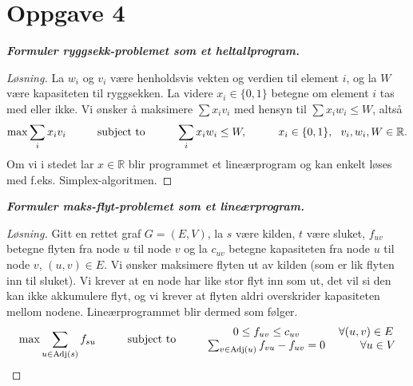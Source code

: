\documentclass[12pt]{article}
\newenvironment{solution}{\begin{proof}[Løsning]}{\end{proof}}
\begin{document}
\section{Oppgave 4}
\it{\textbf{Formuler ryggsekk-problemet som et heltallprogram.}}
\begin{solution}
La $w_i$ og $v_i$ være henholdsvis vekten og verdien til element $i$, og la $W$ være kapasiteten til ryggsekken. La videre $x_i \in \{0, 1\}$ betegne om element $i$ tas med eller ikke. Vi ønsker å maksimere $\sum x_i v_i$ med hensyn til $\sum x_i w_i \leq W$, altså
\begin{equation*}
\max \sum_{i} x_i v_i \hspace{1cm} \textrm{subject to} \hspace{1 cm} \sum_i x_i w_i \leq W, \hspace{1cm} x_i \in \{0, 1\},~~ v_i, w_i, W \in \mathbb{R}.
\end{equation*}
Om vi i stedet lar $x \in \mathbb{R}$ blir programmet et lineærprogram og kan enkelt løses med f.eks. Simplex-algoritmen.
\end{solution}

\it{\textbf{Formuler maks-flyt-problemet som et lineærprogram.}}

\begin{solution}
Gitt en rettet graf $G = (E, V)$, la $s$ være kilden, $t$ være sluket, $f_{uv}$ betegne flyten fra node $u$ til node $v$ og  la  $c_{uv}$ betegne kapasiteten fra node $u$ til node $v$, $(u, v) \in E$. Vi ønsker maksimere flyten ut av kilden (som er lik flyten inn til sluket). Vi krever at en node har like stor flyt inn som ut, det vil si den kan ikke akkumulere flyt, og vi krever at flyten aldri overskrider kapasiteten mellom nodene. Lineærprogrammet blir dermed som følger.
\begin{equation*}
\max \sum_{u \in \textrm{Adj}(s)} f_{su} \hspace{1cm} \textrm{subject to} \hspace{1 cm}
\begin{matrix}
0 \leq f_{uv} \leq c_{uv} &\forall (u, v) \in E\\
\sum_{v \in \textrm{Adj}(u)} f_{vu} - f_{uv} = 0 &\hspace{0.75cm}\forall u \in V
\end{matrix}
\end{equation*}
\end{solution}
\end{document}
